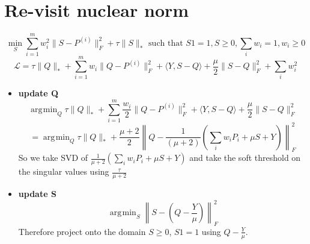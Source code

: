 \documentclass[11pt]{article}
\newcommand{\norm}[1]{\left\lVert#1\right\rVert}
\DeclareMathOperator*{\argmin}{\arg\!\min}
\begin{document}


%
%
%
%




\section*{Re-visit nuclear norm}
$$\min_S \sum_{i=1}^{m} w_i^2 \|S-P^{(i)}\|^2_F + \tau \|S\|_* \text{  such that  }S1 = 1, S\geq 0, \sum_i w_i = 1, w_i \geq 0$$
$$\mathcal{L} = \tau \|Q\|_* + \sum_{i=1}^{m} w_i \|Q-P^{(i)}\|_F^2 + \langle Y, S-Q \rangle + \frac{\mu}{2} \|S-Q\|_F^2 + \sum_i w_i^2$$

\begin{itemize}
\item \textbf{update Q}\\
$$\argmin_Q \tau \|Q\|_* + \sum_{i=1}^{m} \frac{w_i}{2} \|Q-P^{(i)}\|_F^2 + \langle Y, S-Q \rangle + \frac{\mu}{2} \|S-Q\|_F^2$$
$$=\argmin_Q \tau \|Q\|_*+ \frac{\mu+2}{2} \norm{Q - \frac{1}{(\mu+2)} \left(\sum_i w_i P_i + \mu S + Y\right)}_F^2$$
So we take SVD of $\frac{1}{\mu + 2} \left( \sum_i w_i P_i + \mu S + Y \right)$ and take the soft threshold on the singular values using $\frac{\tau}{\mu+2}$
\item \textbf{update S}\\
$$\argmin_S \norm{ S - \left( Q-\frac{Y}{\mu}\right)}_F^2$$
Therefore project onto the domain $S \geq 0$, $S1=1$ using $Q-\frac{Y}{\mu}$. 
\end{itemize}
\end{document}
